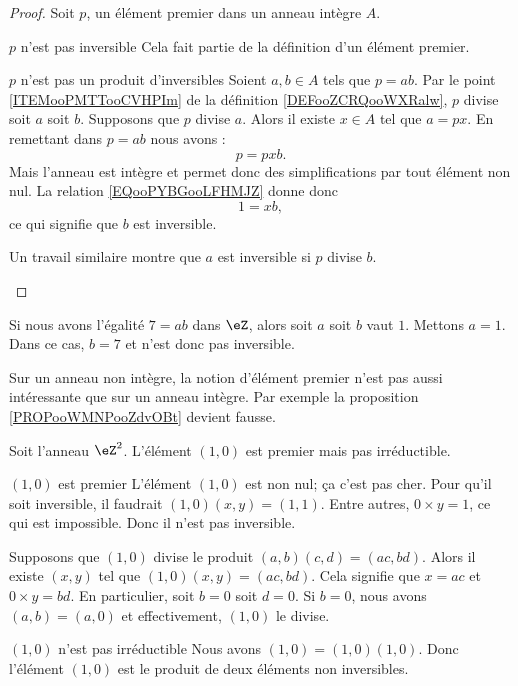 \begin{proof}
    Soit \( p\), un élément premier dans un anneau intègre \( A\).
    \begin{subproof}
        \item[\( p\) n'est pas inversible]
            Cela fait partie de la définition d'un élément premier.
        \item[\( p\) n'est pas un produit d'inversibles]
            Soient \( a,b\in A\) tels que \( p=ab\). Par le point \ref{ITEMooPMTTooCVHPIm} de la définition \ref{DEFooZCRQooWXRalw}, \( p\) divise soit \( a\) soit \( b\). Supposons que \( p\) divise \( a\). Alors il existe \( x\in A\) tel que \( a=px\). En remettant dans \( p=ab\) nous avons :
            \begin{equation}        \label{EQooPYBGooLFHMJZ}
                p=pxb.
            \end{equation}
            Mais l'anneau est intègre et permet donc des simplifications par tout élément non nul. La relation \ref{EQooPYBGooLFHMJZ} donne donc 
            \begin{equation}
                1=xb,
            \end{equation}
            ce qui signifie que \( b\) est inversible.

            Un travail similaire montre que \( a\) est inversible si \( p\) divise \( b\).
    \end{subproof}
\end{proof}

\begin{example}
    Si nous avons l'égalité \( 7=ab\) dans \( \eZ\), alors soit \( a\) soit \( b\) vaut \( 1\). Mettons \( a=1\). Dans ce cas, \( b=7\) et n'est donc pas inversible.
\end{example}

Sur un anneau non intègre, la notion d'élément premier n'est pas aussi intéressante que sur un anneau intègre. Par exemple la proposition \ref{PROPooWMNPooZdvOBt} devient fausse.

\begin{example}     \label{EXooEIUEooCZCPMC}
    Soit l'anneau \( \eZ^2\). L'élément \( (1,0)\) est premier mais pas irréductible.
    \begin{subproof}
        \item[\( (1,0)\) est premier]
            L'élément \( (1,0)\) est non nul; ça c'est pas cher. Pour qu'il soit inversible, il faudrait \( (1,0)(x,y)=(1,1)\). Entre autres, \( 0\times y=1\), ce qui est impossible. Donc il n'est pas inversible.

            Supposons que \( (1,0)\) divise le produit \( (a,b)(c,d)=(ac,bd)\). Alors il existe \( (x,y)\) tel que \( (1,0)(x,y)=(ac,bd)\). Cela signifie que \( x=ac\) et \( 0\times y=bd\). En particulier, soit \( b=0\) soit \( d=0\). Si \( b=0\), nous avons \( (a,b)=(a,0)\) et effectivement, \( (1,0)\) le divise.
        \item[\( (1,0)\) n'est pas irréductible]
            Nous avons \( (1,0)=(1,0)(1,0)\). Donc l'élément \( (1,0)\) est le produit de deux éléments non inversibles.
    \end{subproof}
\end{example}

